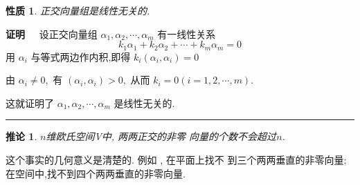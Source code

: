 \documentclass[13pt]{beamer}
\newtheorem*{coro}{推论}
\newtheorem*{prop}{性质}
\def\qed{\nopagebreak\hfill{\rule{4pt}{7pt}}\medbreak}
\def\pf{{\bf 证明~~ }}
\begin{document}
\begin{frame}
\begin{prop}
	正交向量组是线性无关的.  
\end{prop}
\pf 设正交向量组 ${\alpha}_{1}, {\alpha}_{2}, \cdots, {\alpha}_{m}$ 有一线性关系
\[
k_{1} {\alpha}_{1}+k_{2} {\alpha}_{2}+\cdots+k_{m} {\alpha}_{m}={0}
\]
用 ${\alpha}_{i}$ 与等式两边作内积,即得
$k_{i}\left({\alpha}_{i}, {\alpha}_{i}\right)=0$

由 ${\alpha}_{i} \neq {0},$ 有 $\left({\alpha}_{i}, {\alpha}_{i}\right)>0,$ 从而 $k_{i}=0(i=1,2, \cdots, m) .$ 

这就证明了
${\alpha}_{1}, {\alpha}_{2}, \cdots, {\alpha}_{m}$ 是线性无关的.
\qed
\begin{coro}
	$n$维欧氏空间V中, 两两正交的非零 向量的个数不会超过$n$. 
\end{coro}

这个事实的几何意义是清楚的.
例如 , 在平面上找不 到三个两两垂直的非零向量; 在空间中,找不到四个两两垂直的非零向量.

\end{frame}
\end{document}
